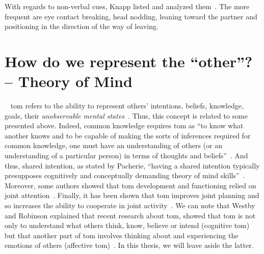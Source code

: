 \documentclass[a4paper,11pt,twoside]{StyleThese}
\begin{document}
With regards to non-verbal cues, Knapp \etal{} listed and analyzed them~\cite{knapp_1973_rhetoric}. The more frequent are eye contact breaking, head nodding, leaning toward the partner and positioning in the direction of the way of leaving.

\section{How do we represent the ``other''? -- Theory of Mind}~\label{chap1:subsec:tom}
\acrfull{tom} refers to the ability to represent others' intentions, beliefs, knowledge, goals, \ie their \emph{unobservable mental states}~\cite{premack_1978_does,povinelli_2004_we}. Thus, this concept is related to some presented above. Indeed, common knowledge requires \acrshort{tom} as ``to know what another knows and to be capable of making the sorts of inferences required for common knowledge, one must have an understanding of others (or an understanding of a particular person) in terms of thoughts and beliefs''~\cite[p.~82]{tollefsen_2005_let}. And thus, shared intention, as stated by Pacherie, ``having a shared intention typically presupposes cognitively and conceptually demanding theory of mind skills''~\cite[p.~1817]{pacherie_2013_intentional}. Moreover, some authors showed that \acrshort{tom} development and functioning relied on joint attention~\cite{sodian_2015_declarative, camaioni_2004_role}.  Finally, it has been shown that \acrshort{tom} improves joint planning and so increases the ability to cooperate in joint activity~\cite{astington_1995_theory}. We can note that Westby and Robinson explained that recent research about \acrshort{tom}, showed that \acrshort{tom} is not only to understand what others think, know, believe or intend (cognitive \acrshort{tom}) but that another part of \acrshort{tom} involves thinking about and experiencing the emotions of others (affective \acrshort{tom})~\cite{westby_2014_developmental}. In this thesis, we will leave aside the latter.
\end{document}
